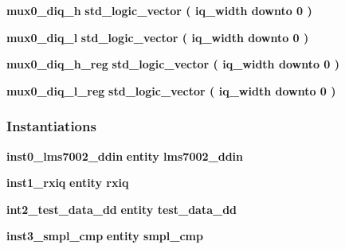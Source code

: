 \begin{DoxyCompactItemize}
{\bf mux0\+\_\+diq\+\_\+h} {\bfseries \textcolor{comment}{std\+\_\+logic\+\_\+vector}\textcolor{vhdlchar}{ }\textcolor{vhdlchar}{(}\textcolor{vhdlchar}{ }\textcolor{vhdlchar}{ }\textcolor{vhdlchar}{ }\textcolor{vhdlchar}{ }{\bfseries {\bf iq\+\_\+width}} \textcolor{vhdlchar}{ }\textcolor{keywordflow}{downto}\textcolor{vhdlchar}{ }\textcolor{vhdlchar}{ } \textcolor{vhdldigit}{0} \textcolor{vhdlchar}{ }\textcolor{vhdlchar}{)}\textcolor{vhdlchar}{ }} 
\item 
{\bf mux0\+\_\+diq\+\_\+l} {\bfseries \textcolor{comment}{std\+\_\+logic\+\_\+vector}\textcolor{vhdlchar}{ }\textcolor{vhdlchar}{(}\textcolor{vhdlchar}{ }\textcolor{vhdlchar}{ }\textcolor{vhdlchar}{ }\textcolor{vhdlchar}{ }{\bfseries {\bf iq\+\_\+width}} \textcolor{vhdlchar}{ }\textcolor{keywordflow}{downto}\textcolor{vhdlchar}{ }\textcolor{vhdlchar}{ } \textcolor{vhdldigit}{0} \textcolor{vhdlchar}{ }\textcolor{vhdlchar}{)}\textcolor{vhdlchar}{ }} 
\item 
{\bf mux0\+\_\+diq\+\_\+h\+\_\+reg} {\bfseries \textcolor{comment}{std\+\_\+logic\+\_\+vector}\textcolor{vhdlchar}{ }\textcolor{vhdlchar}{(}\textcolor{vhdlchar}{ }\textcolor{vhdlchar}{ }\textcolor{vhdlchar}{ }\textcolor{vhdlchar}{ }{\bfseries {\bf iq\+\_\+width}} \textcolor{vhdlchar}{ }\textcolor{keywordflow}{downto}\textcolor{vhdlchar}{ }\textcolor{vhdlchar}{ } \textcolor{vhdldigit}{0} \textcolor{vhdlchar}{ }\textcolor{vhdlchar}{)}\textcolor{vhdlchar}{ }} 
\item 
{\bf mux0\+\_\+diq\+\_\+l\+\_\+reg} {\bfseries \textcolor{comment}{std\+\_\+logic\+\_\+vector}\textcolor{vhdlchar}{ }\textcolor{vhdlchar}{(}\textcolor{vhdlchar}{ }\textcolor{vhdlchar}{ }\textcolor{vhdlchar}{ }\textcolor{vhdlchar}{ }{\bfseries {\bf iq\+\_\+width}} \textcolor{vhdlchar}{ }\textcolor{keywordflow}{downto}\textcolor{vhdlchar}{ }\textcolor{vhdlchar}{ } \textcolor{vhdldigit}{0} \textcolor{vhdlchar}{ }\textcolor{vhdlchar}{)}\textcolor{vhdlchar}{ }} 
\end{DoxyCompactItemize}
\subsubsection*{Instantiations}
 \begin{DoxyCompactItemize}
\item 
{\bf inst0\+\_\+lms7002\+\_\+ddin}  {\bfseries entity lms7002\+\_\+ddin}   
\item 
{\bf inst1\+\_\+rxiq}  {\bfseries entity rxiq}   
\item 
{\bf int2\+\_\+test\+\_\+data\+\_\+dd}  {\bfseries entity test\+\_\+data\+\_\+dd}   
\item 
{\bf inst3\+\_\+smpl\+\_\+cmp}  {\bfseries entity smpl\+\_\+cmp}   
\end{DoxyCompactItemize}


